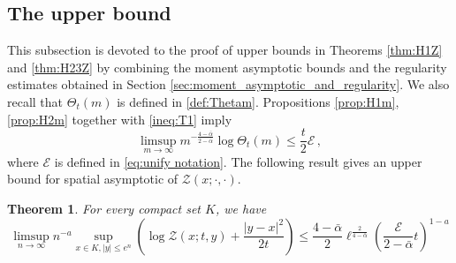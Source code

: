 \documentclass[12pt,reqno]{amsart}
\newtheorem{theorem}{Theorem}[section]
\theoremstyle{remark}
\newcommand{\1}{\mathbf{1}}
\def\Z{\mathcal{Z}}
\def\cee{{\mathcal E}}
\def\lt{\left}
\def\rt{\right}
\begin{document}
\subsection{The upper bound}
This subsection is devoted to the proof of upper bounds in Theorems \ref{thm:H1Z} and \ref{thm:H23Z} by combining the moment asymptotic bounds and the regularity estimates obtained in Section \ref{sec:moment_asymptotic_and_regularity}. 
We also recall that $\Theta_t(m)$ is defined in \eqref{def:Thetam}. {Propositions \ref{prop:H1m}, \ref{prop:H2m} together with \eqref{ineq:T1} imply}
\begin{equation}\label{m.theta}
	\limsup_{m\to\infty}m^{-\frac{4- \bar\alpha}{2- \bar\alpha}}\log \Theta_t(m)\le \frac t2\cee\,,
\end{equation}
where $\cee$ is defined in \eqref{eq:unify notation}.
The following result gives an upper bound for spatial asymptotic of $\Z(x;\cdot,\cdot)$. 
	\begin{theorem}\label{thm:Z up}
		For every compact set $K$, we have
		\begin{equation}\label{Zup}
			\limsup_{n\to\infty}n^{-a}\sup_{x\in K,|y|\le e^n}\lt(\log \Z(x;t,y)+\frac{|y-x|^2}{2t} \rt)\le \frac{4- \bar\alpha}2\ell^{\frac{2}{4- \bar\alpha}}\lt(\frac{\cee}{2- \bar\alpha}t\rt)^{1-a}
		\end{equation}
	\end{theorem}
\end{document}
